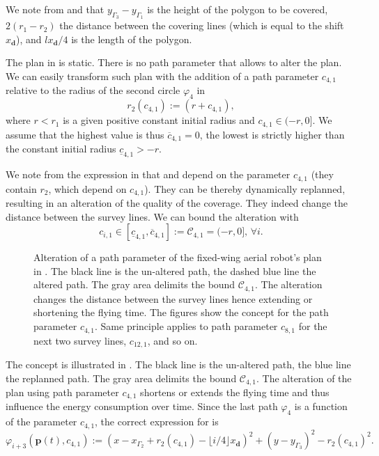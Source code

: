 We note from  and  that $y_{\Gamma_3}-y_{\Gamma_1}$ is the height of the polygon to be covered, $2(r_1-r_2)$ the distance between the covering lines (which is equal to the shift $x_\mathbf{d}$), and $lx_\mathbf{d}/4$ is the length of the polygon.

The plan in  is static. There is no path parameter that allows to alter the plan. We can easily transform such plan with the addition of a path parameter $c_{4,1}$ relative to the radius of the second circle $\varphi_4$ in 
\begin{equation}\label{eq:radius-dynamic}
  r_2(c_{4,1}):=(r+c_{4,1}),
\end{equation}
where $r<r_1$ is a given positive constant initial radius and $c_{4,1}\in(-r,0]$. We assume that the highest value is thus $\overline{c}_{4,1}=0$, the lowest is strictly higher than the constant initial radius $\underline{c}_{4,1}>-r$.

We note from the expression in  that  and  depend on the parameter $c_{4,1}$ (they contain $r_2$, which depend on $c_{4,1}$). They can be thereby dynamically replanned, resulting in an alteration of the quality of the coverage. They indeed change the distance between the survey lines.
We can bound the alteration with 
\begin{equation}\label{eq:path-const-c}
  c_{i,1}\in[\underline{c}_{4,1},\overline{c}_{4,1}]:=\mathcal{C}_{4,1}=(-r,0],\,\forall i.
\end{equation} 

\begin{figure}[p!]
  \centering
  
  \caption[Alteration of a path parameter of the fixed-wing aerial robot's plan]{Alteration of a path parameter of the fixed-wing aerial robot's plan in . The black line is the un-altered path, the dashed blue line the altered path. The gray area delimits the bound $\mathcal{C}_{4,1}$. The alteration changes the distance between the survey lines hence extending or shortening the flying time. The figures show the concept for the path parameter $c_{4,1}$. Same principle applies to path parameter $c_{8,1}$ for the next two survey lines, $c_{12,1}$, and so on.}
  \label{fig:plot5}
\end{figure}

The concept is illustrated in . The black line is the un-altered path, the blue line the replanned path. The gray area delimits the bound $\mathcal{C}_{4,1}$. The alteration of the plan using path parameter $c_{4,1}$ shortens or extends the flying time and thus influence the energy consumption over time. Since the last path $\varphi_4$ is a function of the parameter $c_{4,1}$, the correct expression for  is 
\begin{equation}\label{eq:line-gene-param}
  \varphi_{i+3}(\mathbf{p}(t),c_{4,1}):=(x-x_{\Gamma_2}+r_2(c_{4,1})-\lfloor i/4\rfloor x_\mathbf{d})^2+(y-y_{\Gamma_3})^2-r_2(c_{4,1})^2.
\end{equation}

